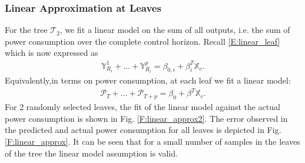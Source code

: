 \subsubsection{Linear Approximation at Leaves}
For the tree $\mathcal{T}_2$, we fit a linear model on the sum of all outputs, i.e. the sum of power consumption over the complete control horizon. Recall \eqref{E:linear_leaf} which is now expressed as
\begin{gather}
\mathbb{Y}_{R_i}^1+ \dots + \mathbb{Y}_{R_i}^p  = \beta_{0,i} + \beta^T_i \mathbb{X}_c.
\end{gather}
Equivalently,in terms on power consumption, at each leaf we fit a linear model:
\begin{gather}
\mathcal{P}_{T}+ \dots + \mathcal{P}_{T+p}  = \beta_{0} + \beta^T \mathbb{X}_c.
\end{gather}
For 2 randomly selected leaves, the fit of the linear model against the actual power consumption is shown in Fig. \ref{F:linear_approx2}. The error observed in the predicted and actual power consumption for all leaves is depicted in Fig. \ref{F:linear_approx}.
It can be seen that for a small number of samples in the leaves of the tree the linear model assumption is valid.

